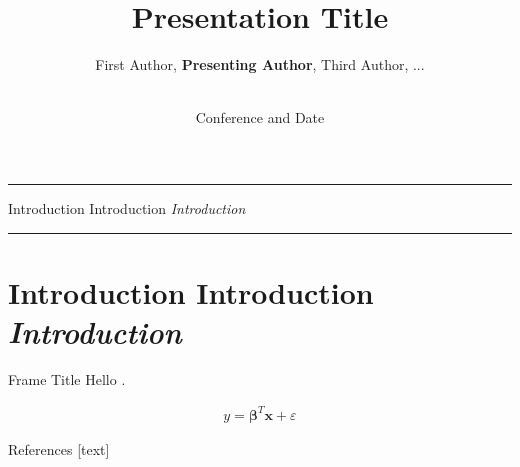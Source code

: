 \documentclass[10pt]{beamer} %
\author{
    First Author,
    \textbf{Presenting Author},
    Third Author, ...}
\title{
    Presentation Title}
\institute{Technical University of Denmark}
\date{\\[\bigskipamount]Conference and Date}
\newcommand{\transframe}[1]{
    \begin{frame}[c]{}
        \begin{center}
        \hrule \vskip 15pt
        \huge #1
        \vskip 15pt \hrule
        \end{center}
    \end{frame}
}
\newcommand{\secframe}[1]{
    \transframe{#1}
    \section{#1}
}
\renewcommand{\vec}[1]{\bm{#1}}
\begin{document}
\begin{frame}[t,plain]
\titlepage
\end{frame}

\secframe{Introduction Introduction \emph{Introduction}}

\begin{frame}[t]{Frame Title}
Hello \cite{dummycite}.

\begin{align}
		y = \vec{\beta}^T \vec{x} + \varepsilon
\end{align}
\end{frame}

\begin{frame}[t]{References}  %
    [text]
    \renewcommand*{\bibfont}{\small}
    \printbibliography
\end{frame}
\end{document}
